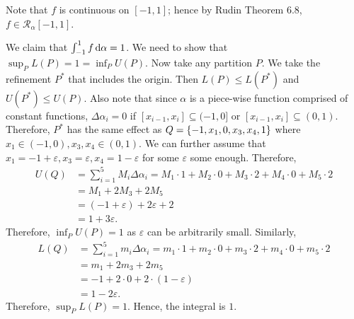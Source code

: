 \documentclass[12pt]{article}
\begin{document}
\begin{fproof}[4(d)]
   Note that \(f\) is continuous on \([-1,1]\); hence by Rudin Theorem 6.8, \(f \in \mathcal{R}_{\alpha}[-1,1]\).

   We claim that \(\int_{-1}^{1} f \mathop{}\!\mathrm{d}\alpha = 1\).
   We need to show that \(\sup_P L(P) = 1 = \inf_P U(P)\).
   Now take any partition \(P\).
   We take the refinement \(P^*\) that includes the origin. Then \(L(P) \leq L(P^*)\) and \(U(P^*) \leq U(P)\).
   Also note that since \(\alpha\) is a piece-wise function comprised of constant functions, \(\Delta \alpha_i = 0\) if \([x_{i-1}, x_i] \subseteq (-1, 0]\) or \([x_{i-1}, x_i] \subseteq (0,1)\).
   Therefore, \(P^*\) has the same effect as \(Q = \left\{ -1, x_1, 0, x_3, x_4, 1 \right\}\) where \(x_1 \in (-1,0), x_3,x_4 \in (0,1)\).
   We can further assume that \(x_1 = -1 + \varepsilon, x_3 = \varepsilon, x_4 = 1-\varepsilon\) for some \(\varepsilon\) some enough.
   Therefore,
   \begin{align*}
    U(Q) & = \sum_{i=1}^{5}M_i \Delta \alpha_i = M_1 \cdot 1 + M_2 \cdot 0 + M_3 \cdot 2 + M_4 \cdot 0 +  M_5 \cdot 2\\
    & = M_1 + 2M_3 + 2M_5\\
    & = (-1 + \varepsilon) + 2\varepsilon + 2\\
    & = 1 + 3 \varepsilon.
   \end{align*}
   Therefore, \(\inf_P U(P)= 1\) as \(\varepsilon\) can be arbitrarily small.
   Similarly,
   \begin{align*}
    L(Q) & = \sum_{i=1}^{5}m_i \Delta \alpha_i = m_1 \cdot 1 + m_2 \cdot 0 + m_3 \cdot 2 + m_4 \cdot 0 +  m_5 \cdot 2\\
    &= m_1 + 2m_3 + 2m_5\\
    &= -1 + 2 \cdot 0 + 2 \cdot (1- \varepsilon)\\
    & = 1-2 \varepsilon.
   \end{align*}
   Therefore, \(\sup_P L(P) = 1\).
   Hence, the integral is \(1\).
\end{fproof}
\newpage

\begin{fproof}[5]

\end{fproof}
\end{document}
